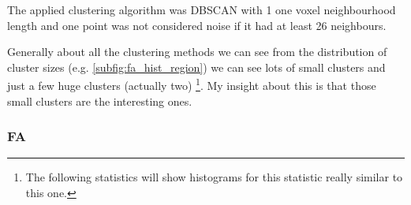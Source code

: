 \documentclass[a4paper,11pt]{report}
\begin{document}
    The applied clustering algorithm was DBSCAN with 1 one voxel neighbourhood length and one point was not considered noise if it had at least 26 neighbours.

    Generally about all the clustering methods we can see from the distribution of cluster sizes (e.g. \ref{subfig:fa_hist_region}) we can see lots of small clusters and just a few huge clusters (actually two) \footnote{The following statistics will show histograms for this statistic really similar to this one.}. My insight about this is that those small clusters are the interesting ones.

    \newpage
    \subsubsection{FA}
    \begin{figure}[!ht]
      \centering


\end{figure}
\end{document}
